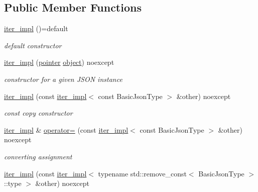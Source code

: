 \subsection*{Public Member Functions}
\begin{DoxyCompactItemize}
\item 
\mbox{\hyperlink{classnlohmann_1_1detail_1_1iter__impl_a19aa457f9c4af1b7e3af59839132cc5c}{iter\+\_\+impl}} ()=default
\begin{DoxyCompactList}\small\item\em default constructor \end{DoxyCompactList}\item 
\mbox{\hyperlink{classnlohmann_1_1detail_1_1iter__impl_a88a00484ac201c52fc5f613d88a2918b}{iter\+\_\+impl}} (\mbox{\hyperlink{classnlohmann_1_1detail_1_1iter__impl_a69e52f890ce8c556fd68ce109e24b360}{pointer}} \mbox{\hyperlink{namespacenlohmann_1_1detail_a1ed8fc6239da25abcaf681d30ace4985aa8cfde6331bd59eb2ac96f8911c4b666}{object}}) noexcept
\begin{DoxyCompactList}\small\item\em constructor for a given J\+S\+ON instance \end{DoxyCompactList}\item 
\mbox{\hyperlink{classnlohmann_1_1detail_1_1iter__impl_a71f84fb6e009619f12972bcf9002b8cd}{iter\+\_\+impl}} (const \mbox{\hyperlink{classnlohmann_1_1detail_1_1iter__impl}{iter\+\_\+impl}}$<$ const Basic\+Json\+Type $>$ \&other) noexcept
\begin{DoxyCompactList}\small\item\em const copy constructor \end{DoxyCompactList}\item 
\mbox{\hyperlink{classnlohmann_1_1detail_1_1iter__impl}{iter\+\_\+impl}} \& \mbox{\hyperlink{classnlohmann_1_1detail_1_1iter__impl_a9a5cd7864a8f848ef107d3f5a330f5e7}{operator=}} (const \mbox{\hyperlink{classnlohmann_1_1detail_1_1iter__impl}{iter\+\_\+impl}}$<$ const Basic\+Json\+Type $>$ \&other) noexcept
\begin{DoxyCompactList}\small\item\em converting assignment \end{DoxyCompactList}\item 
\mbox{\hyperlink{classnlohmann_1_1detail_1_1iter__impl_a867f7eb55091be31b013adb3e46816d3}{iter\+\_\+impl}} (const \mbox{\hyperlink{classnlohmann_1_1detail_1_1iter__impl}{iter\+\_\+impl}}$<$ typename std\+::remove\+\_\+const$<$ Basic\+Json\+Type $>$\+::type $>$ \&other) noexcept

\end{DoxyCompactItemize}
